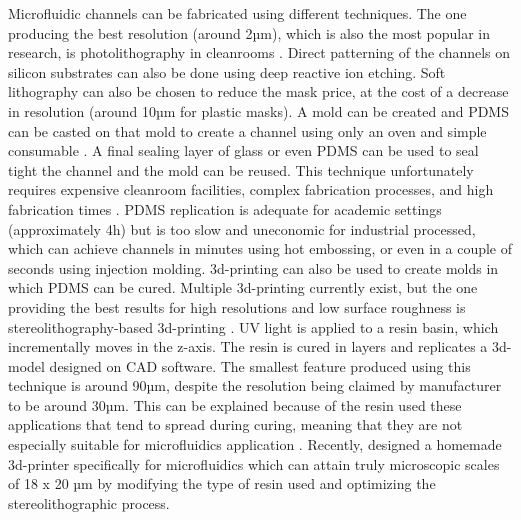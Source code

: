 Microfluidic channels can be fabricated using different techniques. The one producing the best resolution (around 2µm), which is also the most popular in research, is photolithography in cleanrooms \cite{Olanrewaju2018}. Direct patterning of the channels on silicon substrates can also be done using deep reactive ion etching. Soft lithography can also be chosen to reduce the mask price, at the cost of a decrease in resolution (around 10µm for plastic masks). A mold can be created and PDMS can be casted on that mold to create a channel using only an oven and simple consumable \cite{Olanrewaju2018}. A final sealing layer of glass or even PDMS can be used to seal tight the channel and the mold can be reused. This technique unfortunately requires expensive cleanroom facilities, complex fabrication processes, and high fabrication times \cite{Olanrewaju2018}. PDMS replication is adequate for academic settings (approximately 4h) but is too slow and uneconomic for industrial processed, which can achieve channels in minutes using hot embossing, or even in a couple of seconds using injection molding. 3d-printing can also be used to create molds in which PDMS can be cured. Multiple 3d-printing currently exist, but the one providing the best results for high resolutions and low surface roughness is stereolithography-based 3d-printing \cite{Olanrewaju2018,Gong2017}. UV light is applied to a resin basin, which incrementally moves in the z-axis. The resin is cured in layers and replicates a 3d-model designed on CAD software. The smallest feature produced using this technique is around 90µm, despite the resolution being claimed by manufacturer to be around 30µm. This can be explained because of the resin used these applications that tend to spread during curing, meaning that they are not especially suitable for microfluidics application \cite{Olanrewaju2018,Gong2017}. Recently, \citep{Gong2017} designed a homemade 3d-printer specifically for microfluidics which can attain truly microscopic scales of 18 x 20 µm by modifying the type of resin used and optimizing the stereolithographic process. 
